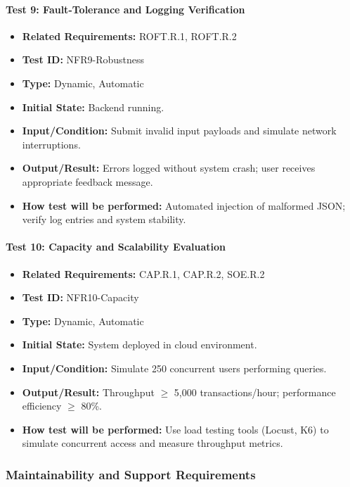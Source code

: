 \documentclass[12pt, titlepage]{article}
\begin{document}
\paragraph{Test 9: Fault-Tolerance and Logging Verification}
\begin{itemize}
    \item \textbf{Related Requirements:} ROFT.R.1, ROFT.R.2
    \item \textbf{Test ID:} NFR9-Robustness
    \item \textbf{Type:} Dynamic, Automatic
    \item \textbf{Initial State:} Backend running.
    \item \textbf{Input/Condition:} Submit invalid input payloads and simulate network interruptions.
    \item \textbf{Output/Result:} Errors logged without system crash; user receives appropriate feedback message.
    \item \textbf{How test will be performed:} Automated injection of malformed JSON; verify log entries and system stability.
\end{itemize}

\paragraph{Test 10: Capacity and Scalability Evaluation}
\begin{itemize}
    \item \textbf{Related Requirements:} CAP.R.1, CAP.R.2, SOE.R.2
    \item \textbf{Test ID:} NFR10-Capacity
    \item \textbf{Type:} Dynamic, Automatic
    \item \textbf{Initial State:} System deployed in cloud environment.
    \item \textbf{Input/Condition:} Simulate 250 concurrent users performing queries.
    \item \textbf{Output/Result:} Throughput $\geq$ 5,000 transactions/hour; performance efficiency $\geq$ 80\%.
    \item \textbf{How test will be performed:} Use load testing tools (Locust, K6) to simulate concurrent access and measure throughput metrics.
\end{itemize}

\subsubsection{Maintainability and Support Requirements}
\end{document}
